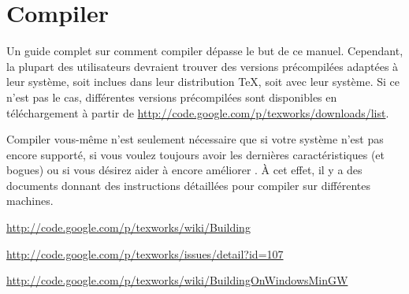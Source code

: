 
\chapter{Compiler {\Tw}}
\label{sec.compiling}

Un guide complet sur comment compiler \Tw{} dépasse le but de ce manuel. Cependant, la plupart des utilisateurs devraient trouver des versions précompilées adaptées à leur système, soit inclues dans leur distribution \TeX, soit avec leur système. Si ce n'est pas le cas, différentes versions précompilées sont disponibles en téléchargement à partir de \url{http://code.google.com/p/texworks/downloads/list}.

Compiler \Tw{} vous-même n'est seulement nécessaire que si votre système n'est pas encore supporté, si vous voulez toujours avoir les dernières caractéristiques (et bogues) ou si vous  désirez aider à encore améliorer \Tw. À cet effet, il y a des documents donnant des instructions détaillées pour compiler \Tw{} sur différentes machines.

\begin{OSLinux}
\noindent\url{http://code.google.com/p/texworks/wiki/Building} \\
\end{OSLinux}

\begin{OSMac}
\noindent\url{http://code.google.com/p/texworks/issues/detail?id=107} \\
\end{OSMac}

\begin{OSWindows}
\noindent\url{http://code.google.com/p/texworks/wiki/BuildingOnWindowsMinGW} \\
\end{OSWindows}
